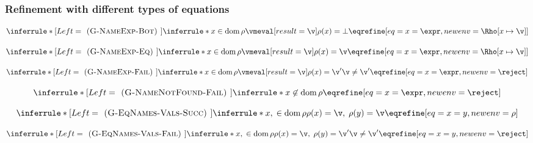 \documentclass[]{article}
\DeclareMathOperator{\dom}{dom}
\begin{document}

\subsubsection{Refinement with different types of equations}

\[
\inferrule*[Left=\textsc{ (G-NameExp-Bot) }]
    {\inferrule* {}
    {
    x \in \dom \rho
    \\\\
    \vmeval[result=\v]
    \\\\
    \rho(x) = \bot
    }}
    {\eqrefine[eq={x = \expr},newenv={\Rho[x \mapsto \v]}]}
\]

\[
\inferrule*[Left=\textsc{ (G-NameExp-Eq) }]
    {\inferrule* {}
    {
    x \in \dom \rho
    \\\\
    \vmeval[result=\v]
    \\\\
    \rho(x) = \v
    }}
    {\eqrefine[eq={x = \expr},newenv={\Rho[x \mapsto \v]}]}
\]

\[
\inferrule*[Left=\textsc{ (G-NameExp-Fail) }]
    {\inferrule* {}
    {
    x \in \dom \rho
    \\\\
    \vmeval[result=\v]
    \\\\ 
    \rho(x) = \v'
    \\\\
    \v \neq \v'
    }}
    {\eqrefine[eq={x = \expr},newenv=\reject]}
\]

\[
\inferrule*[Left=\textsc{ (G-NameNotFound-Fail) }]
    {\inferrule* {}
    {
    x \not\in \dom \rho
    }}
    {\eqrefine[eq={x = \expr},newenv=\reject]}
\]

\[
\inferrule*[Left=\textsc{ (G-EqNames-Vals-Succ) }]
    {\inferrule* {}
    {
    x,\;  \in \dom \rho
    \\\\
    \rho(x) = \v,\; \rho(y) = \v
    }}
    {\eqrefine[eq={x = y},newenv=\rho]}
\]

\[
\inferrule*[Left=\textsc{ (G-EqNames-Vals-Fail) }]
    {\inferrule* {}
    {
    x,\;  \in \dom \rho
    \\\\
    \rho(x) = \v,\; \rho(y) = \v'
    \\\\
    \v \neq \v'}}
    {\eqrefine[eq={x = y},newenv=\reject]}
\]
\end{document}
